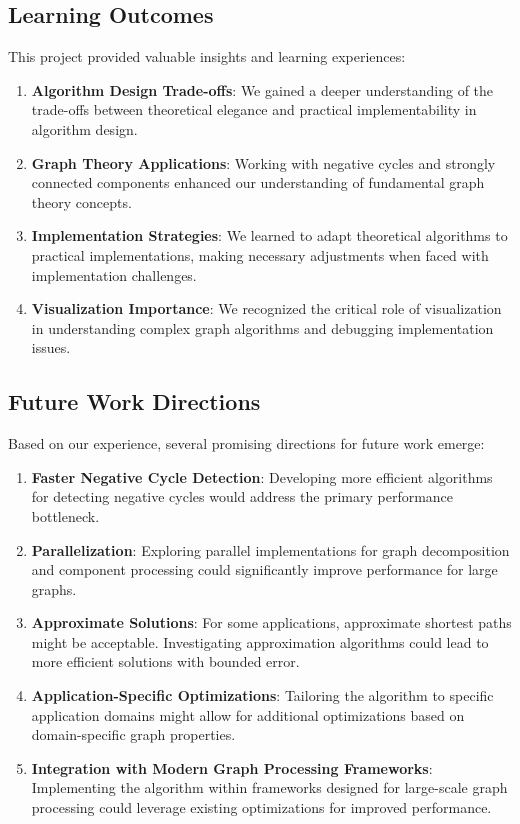 \documentclass[11pt]{article}
\begin{document}
\subsection{Learning Outcomes}

This project provided valuable insights and learning experiences:

\begin{enumerate}
    \item \textbf{Algorithm Design Trade-offs}: We gained a deeper understanding of the trade-offs between theoretical elegance and practical implementability in algorithm design.
    
    \item \textbf{Graph Theory Applications}: Working with negative cycles and strongly connected components enhanced our understanding of fundamental graph theory concepts.
    
    \item \textbf{Implementation Strategies}: We learned to adapt theoretical algorithms to practical implementations, making necessary adjustments when faced with implementation challenges.
    
    \item \textbf{Visualization Importance}: We recognized the critical role of visualization in understanding complex graph algorithms and debugging implementation issues.
\end{enumerate}

\subsection{Future Work Directions}

Based on our experience, several promising directions for future work emerge:

\begin{enumerate}
    \item \textbf{Faster Negative Cycle Detection}: Developing more efficient algorithms for detecting negative cycles would address the primary performance bottleneck.
    
    \item \textbf{Parallelization}: Exploring parallel implementations for graph decomposition and component processing could significantly improve performance for large graphs.
    
    \item \textbf{Approximate Solutions}: For some applications, approximate shortest paths might be acceptable. Investigating approximation algorithms could lead to more efficient solutions with bounded error.
    
    \item \textbf{Application-Specific Optimizations}: Tailoring the algorithm to specific application domains might allow for additional optimizations based on domain-specific graph properties.
    
    \item \textbf{Integration with Modern Graph Processing Frameworks}: Implementing the algorithm within frameworks designed for large-scale graph processing could leverage existing optimizations for improved performance.
\end{enumerate}
\end{document}
